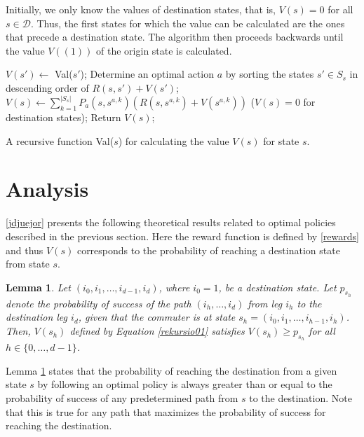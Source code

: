 \documentclass[dissertation,draft*]{aaltoseries}
\newtheorem{lemma}[theorem]{Lemma}
\begin{document}
Initially, we only know the values of destination states, that is, $V(s)=0$ for all $s \in \mathcal{D}$.
Thus, the first states for which the value can be calculated
are the ones that precede a destination state. 
The algorithm then proceeds backwards until the value $V((1))$ of the origin state is calculated.

\begin{algorithm}
\begin{algorithmic}
\STATE $V(s') \leftarrow $ Val($s'$);
\STATE Determine an optimal action $a$ by sorting the states $s' \in S_{s}$ in descending order of $R(s,s') + V(s')$;
\STATE $V(s) \leftarrow \sum_{k=1}^{|S_s|} P_{a}(s,s^{a,k}) \left( R(s,s^{a,k}) +V(s^{a,k}) \right)$ \hfill ($V(s) = 0$ for destination states);
\STATE Return $V(s)$;
\ENDFOR
\end{algorithmic}
\caption{A recursive function Val($s$) for calculating the value $V(s)$ for state $s$.}
\label{backward01}
\end{algorithm}



\section{Analysis}
\label{analysis}
\ref{jdjuejor} presents the following theoretical results related to 
optimal policies described in the previous section. Here the reward function is defined by \eqref{rewards} and
thus $V(s)$ corresponds to the probability of reaching a destination state from state $s$.
\begin{lemma}
\label{perustulos01}
Let $(i_0,i_{1},\ldots,i_{d-1},i_d)$, where $i_0=1$, be a destination state.
Let $p_{s_h}$ %
denote the probability of success of the path $(i_h,\ldots,i_d)$ from leg $i_h$
to the destination leg $i_d$,
given that the commuter is at state $s_h=(i_0,i_1,\ldots,i_{h-1},i_{h})$. %
Then, $V(s_h)$ defined by Equation \eqref{rekursio01} satisfies 
$V(s_h) \geq p_{s_h}$ %
for all ${h \in \{0,\ldots,d-1\}}$. 
\end{lemma}
Lemma \ref{perustulos01} states that the probability of reaching the destination
from a given state $s$ by following an optimal policy is always greater than or equal to
the probability of success of any predetermined path from $s$ to the destination.
Note that this is true for any path that maximizes the probability
of success for reaching the destination. 
\end{document}
